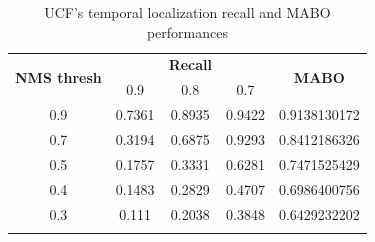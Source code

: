 \documentclass{report}
\begin{document}
\begin{center}
  \begin{longtable}{|| c || c c c | c |}
    \hline
    \multirow{2}{*}{\textbf{NMS thresh}} & {} & {\textbf{Recall}} & {} & \multirow{2}{*}{\textbf{MABO}} \\
      {} & 0.9 & 0.8 & 0.7 & {} \\
      \hline
      0.9 & 0.7361 & 0.8935 & 0.9422 & 0.9138130172 \\
      \hline
      0.7 & 0.3194 & 0.6875 & 0.9293 & 0.8412186326 \\
      \hline
      0.5 & 0.1757 & 0.3331 & 0.6281 & 0.7471525429 \\
      \hline
      0.4 &0.1483 & 0.2829 & 0.4707 & 0.6986400756 \\
      \hline
      0.3 & 0.111 & 0.2038 & 0.3848 & 0.6429232202 \\
      \hline
    \caption{UCF's temporal localization recall and MABO performances}
    \label{table:temp_cls_recall_1}
  \end{longtable}
\end{center}
\end{document}
